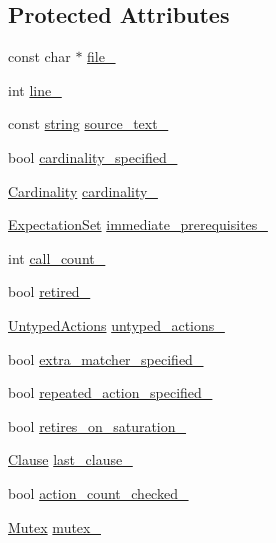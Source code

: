 \subsection*{Protected Attributes}
\begin{DoxyCompactItemize}
\item 
const char $\ast$ \hyperlink{classtesting_1_1internal_1_1_expectation_base_afabf690537298bbb84e9b443f62d7e97}{file\+\_\+}
\item 
int \hyperlink{classtesting_1_1internal_1_1_expectation_base_ab8143119e4b686ff1bb6c985924da57a}{line\+\_\+}
\item 
const \hyperlink{namespacetesting_1_1internal_a8e8ff5b11e64078831112677156cb111}{string} \hyperlink{classtesting_1_1internal_1_1_expectation_base_a8803b5fa8354205a6b57e21a704acbef}{source\+\_\+text\+\_\+}
\item 
bool \hyperlink{classtesting_1_1internal_1_1_expectation_base_ad2ca7220ed1a395bd850ff06c500a402}{cardinality\+\_\+specified\+\_\+}
\item 
\hyperlink{classtesting_1_1_cardinality}{Cardinality} \hyperlink{classtesting_1_1internal_1_1_expectation_base_ad0aedcc01c0c9a998952a2b2f486595c}{cardinality\+\_\+}
\item 
\hyperlink{classtesting_1_1_expectation_set}{Expectation\+Set} \hyperlink{classtesting_1_1internal_1_1_expectation_base_a186eff0fdcacc8c1e1a2becdec11d3cd}{immediate\+\_\+prerequisites\+\_\+}
\item 
int \hyperlink{classtesting_1_1internal_1_1_expectation_base_aea95d46f7583566e3f7a081b0668ad4c}{call\+\_\+count\+\_\+}
\item 
bool \hyperlink{classtesting_1_1internal_1_1_expectation_base_a0afd852f5d7863effc3d304dac6a44cf}{retired\+\_\+}
\item 
\hyperlink{classtesting_1_1internal_1_1_expectation_base_a9b21e82059961b9f1198d3f5d518254f}{Untyped\+Actions} \hyperlink{classtesting_1_1internal_1_1_expectation_base_a9558ff6b8b1b7e3a99fac1f93d1826da}{untyped\+\_\+actions\+\_\+}
\item 
bool \hyperlink{classtesting_1_1internal_1_1_expectation_base_a34f599ac7ae4f1fb7567e0d4c9fadcba}{extra\+\_\+matcher\+\_\+specified\+\_\+}
\item 
bool \hyperlink{classtesting_1_1internal_1_1_expectation_base_abecd382b79252ffc0779d51e058b681c}{repeated\+\_\+action\+\_\+specified\+\_\+}
\item 
bool \hyperlink{classtesting_1_1internal_1_1_expectation_base_a74802f3bedf4ab023b30ee6bb275a4d8}{retires\+\_\+on\+\_\+saturation\+\_\+}
\item 
\hyperlink{classtesting_1_1internal_1_1_expectation_base_a450f34b979ec5814c91d4eab6b78cfc2}{Clause} \hyperlink{classtesting_1_1internal_1_1_expectation_base_a584f296e53b4cc002ddf5e65e44d72d9}{last\+\_\+clause\+\_\+}
\item 
bool \hyperlink{classtesting_1_1internal_1_1_expectation_base_a19933e346f6493005437bdd6812c7a29}{action\+\_\+count\+\_\+checked\+\_\+}
\item 
\hyperlink{classtesting_1_1internal_1_1_mutex}{Mutex} \hyperlink{classtesting_1_1internal_1_1_expectation_base_a364f5473591d08d0ac03595c9050c13e}{mutex\+\_\+}
\end{DoxyCompactItemize}
